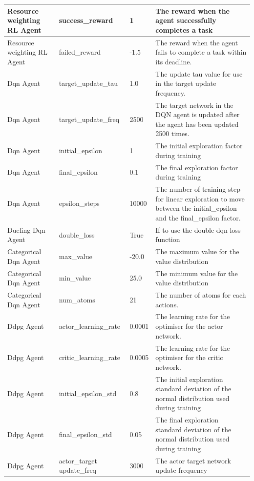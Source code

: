 \begin{longtable}{|p{2cm}|p{3.5cm}|p{2.5cm}|p{6cm}|}
        Resource weighting RL Agent & success\_reward & 1 & The reward when the agent successfully completes a task
            \\ \hline
        Resource weighting RL Agent & failed\_reward & -1.5 & The reward when the agent fails to complete a task within
            its deadline. \\ \hline
        Dqn Agent & target\_update\_tau & 1.0 & The update tau value for use in the target update frequency. \\ \hline
        Dqn Agent & target\_update\_freq & 2500 & The target network in the DQN agent is updated after the agent
            has been updated 2500 times. \\ \hline
        Dqn Agent & initial\_epsilon & 1 & The initial exploration factor during training \\ \hline
        Dqn Agent & final\_epsilon & 0.1 & The final exploration factor during training \\ \hline
        Dqn Agent & epsilon\_steps & 10000 & The number of training step for linear exploration to move between the
            initial\_epsilon and the final\_epsilon factor. \\ \hline
        Dueling Dqn Agent & double\_loss & True & If to use the double dqn loss function \\ \hline
        Categorical Dqn Agent & max\_value & -20.0 & The maximum value for the value distribution \\ \hline
        Categorical Dqn Agent & min\_value & 25.0 & The minimum value for the value distribution \\ \hline
        Categorical Dqn Agent & num\_atoms & 21 & The number of atoms for each actions. \\ \hline
        Ddpg Agent & actor\_learning\_rate & 0.0001 & The learning rate for the optimiser for the actor network. \\ \hline
        Ddpg Agent & critic\_learning\_rate & 0.0005 & The learning rate for the optimiser for the critic network. \\ \hline
        Ddpg Agent & initial\_epsilon\_std & 0.8 & The initial exploration standard deviation of the normal distribution
            used  during training \\ \hline
        Ddpg Agent & final\_epsilon\_std & 0.05 & The final exploration standard deviation of the normal distribution
            used  during training \\ \hline
        Ddpg Agent & actor\_target update\_freq & 3000 & The actor target network update frequency \\ \hline

\end{longtable}
